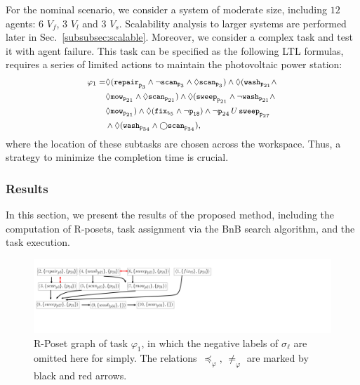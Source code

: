 For the nominal scenario, we consider a system of moderate size,
including $12$ agents: 6 $V_f$, 3 $V_l$ and 3 $V_s$.
Scalability analysis to larger systems are performed later in Sec.~\ref{subsubsec:scalable}.
Moreover, we consider a complex task and test it with agent failure.
This task can be specified as the following LTL formulas,
requires a series of limited actions to
maintain the photovoltaic power station:
\begin{equation}\footnotesize
\label{eq:task1}
  \begin{aligned}
\varphi_1 = & \Diamond(\texttt{repair}_{\texttt{p}_{3}} \wedge \lnot \texttt{scan}_{\texttt{p}_3} \wedge\Diamond \texttt{scan}_{\texttt{p}_3})
\wedge \Diamond (\texttt{wash}_{\texttt{p}_{21}} \wedge \\
&\Diamond \texttt{mow}_{\texttt{p}_{21}} \wedge \Diamond \texttt{scan}_{\texttt{p}_{21}}) \wedge \Diamond ( \texttt{sweep}_{\texttt{p}_{21}} \wedge \lnot \texttt{wash}_{\texttt{p}_{21}} \wedge\\
& \Diamond \texttt{mow}_{\texttt{p}_{21}}) \wedge \Diamond(\texttt{fix}_{\texttt{t}_5} \wedge \lnot \texttt{p}_{\texttt{18}}) \wedge \lnot \texttt{p}_{24} \,U \, \texttt{sweep}_{\texttt{p}_{27}} \\
&\wedge \Diamond (\texttt{wash}_{\texttt{p}_{34}} \wedge \bigcirc \texttt{scan}_{\texttt{p}_{34}}),
\end{aligned}
\end{equation}
where the location of these subtasks are chosen across the workspace.
Thus, a strategy to minimize the completion time is crucial.

\subsubsection{Results}\label{subsubsec:results}
In this section, we present the results of the proposed method, including the computation of R-posets,
task assignment via the BnB search algorithm, and the task execution.

\begin{figure}[t!]
		\centering%
		\includegraphics[height = 0.12 \textwidth]{figures/simulation/taskfinal/ipe_poset_graph.pdf}
	\caption{R-Poset graph of task $\varphi_1$, in which the negative labels of $\sigma_\ell$ are omitted here for simply.
          The relations~$\preceq_\varphi,\, \neq_{\varphi}$ are marked
          by black and red arrows.}
       \label{fig:task12-posets}
\end{figure}

